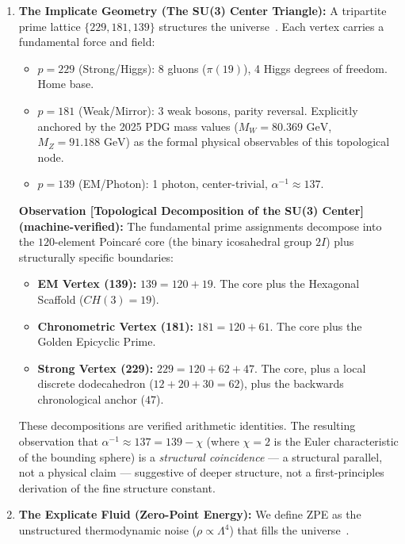 \begin{enumerate}
    \item \textbf{The Implicate Geometry (The SU(3) Center Triangle):} A tripartite prime lattice $\{229, 181, 139\}$ structures the universe~\cite{larue2026chromatic}. Each vertex carries a fundamental force and field:
    \begin{itemize}
        \item $p=229$ (Strong/Higgs): 8 gluons ($\pi(19)$), 4 Higgs degrees of freedom. Home base.
        \item $p=181$ (Weak/Mirror): 3 weak bosons, parity reversal. Explicitly anchored by the 2025 PDG mass values ($M_W = 80.369 \text{ GeV}$, $M_Z = 91.188 \text{ GeV}$) as the formal physical observables of this topological node.
        \item $p=139$ (EM/Photon): 1 photon, center-trivial, $\alpha^{-1} \approx 137$.
    \end{itemize}

    \textbf{Observation [Topological Decomposition of the SU(3) Center] (machine-verified):} The fundamental prime assignments decompose into the $120$-element Poincaré core (the binary icosahedral group $2I$) plus structurally specific boundaries:
    \begin{itemize}
        \item \textbf{EM Vertex (139):} $139 = 120 + 19$. The core plus the Hexagonal Scaffold ($CH(3) = 19$).
        \item \textbf{Chronometric Vertex (181):} $181 = 120 + 61$. The core plus the Golden Epicyclic Prime.
        \item \textbf{Strong Vertex (229):} $229 = 120 + 62 + 47$. The core, plus a local discrete dodecahedron ($12 + 20 + 30 = 62$), plus the backwards chronological anchor ($47$).
    \end{itemize}
    These decompositions are verified arithmetic identities. The resulting observation that $\alpha^{-1} \approx 137 = 139 - \chi$ (where $\chi=2$ is the Euler characteristic of the bounding sphere) is a \emph{structural coincidence} --- a structural parallel, not a physical claim --- suggestive of deeper structure, not a first-principles derivation of the fine structure constant.
    
    \item \textbf{The Explicate Fluid (Zero-Point Energy):} We define ZPE as the unstructured thermodynamic noise ($\rho \propto \Lambda^4$) that fills the universe~\cite{lockwood2025zpe, lockwood2025dwm}.
\end{enumerate}

